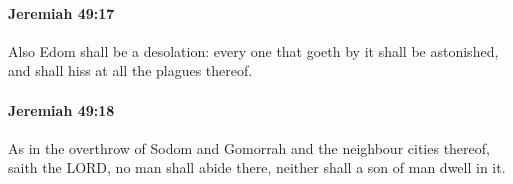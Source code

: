 		\paragraph{Jeremiah 49:17} %
			\label{JEREMIAH-49-17}

			Also Edom shall be a desolation: every one that goeth by it shall be astonished, and shall hiss at all the plagues thereof.


		\paragraph{Jeremiah 49:18} %
			\label{JEREMIAH-49-18}

			As in the overthrow of Sodom and Gomorrah and the neighbour cities thereof, saith the LORD, no man shall abide there, neither shall a son of man dwell in it.


